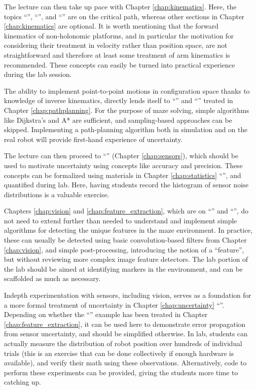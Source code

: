\documentclass[paper=6.14in:9.21in,pagesize=pdftex,11pt,twoside,openright]{scrbook}
\begin{document}
The lecture can then take up pace with Chapter \ref{chap:kinematics}. Here, the topics ``'', ``'', and ``'' are on the critical path, whereas other sections in Chapter \ref{chap:kinematics} are optional. It is worth mentioning that the forward kinematics of non-holonomic platforms, and in particular the motivation for considering their treatment in velocity rather than position space, are not straightforward and therefore at least some treatment of arm kinematics is recommended. These concepts can easily be turned into practical experience during the lab session. 

The ability to implement point-to-point motions in configuration space thanks to knowledge of inverse kinematics, directly lends itself to ``'' and ``'' treated in Chapter \ref{chap:pathplanning}. For the purpose of maze solving, simple algorithms like Dijkstra's and A* are sufficient, and sampling-based approaches can be skipped. Implementing a path-planning algorithm both in simulation and on the real robot will provide first-hand experience of uncertainty. 

The lecture can then proceed to ``'' (Chapter \ref{chap:sensors}), which should be used to motivate uncertainty using concepts like accuracy and precision. These concepts can be formalized using materials in Chapter \ref{chap:statistics} ``'', and quantified during lab. Here, having students record the histogram of sensor noise distributions is a valuable exercise. 

Chapters \ref{chap:vision} and \ref{chap:feature_extraction}, which are on ``'' and ``'', do not need to extend further than needed to understand and implement simple algorithms for detecting the unique features in the maze environment. In practice, these can usually be detected using basic convolution-based filters from Chapter \ref{chap:vision}, and simple post-processing, introducing the notion of a ``feature'', but without reviewing more complex image feature detectors. The lab portion of the lab should be aimed at identifying markers in the environment, and can be scaffolded as much as necessary. 

Indepth experimentation with sensors, including vision, serves as a foundation for a more formal treatment of uncertainty in Chapter \ref{chap:uncertainty} ``''. Depending on whether the ``'' example has been treated in Chapter \ref{chap:feature_extraction}, it can be used here to demonstrate error propagation from sensor uncertainty, and should be simplified otherwise. In lab, students can actually measure the distribution of robot position over hundreds of individual trials (this is an exercise that can be done collectively if enough hardware is available), and verify their math using these observations. Alternatively, code to perform these experiments can be provided, giving the students more time to catching up. 
\end{document}
